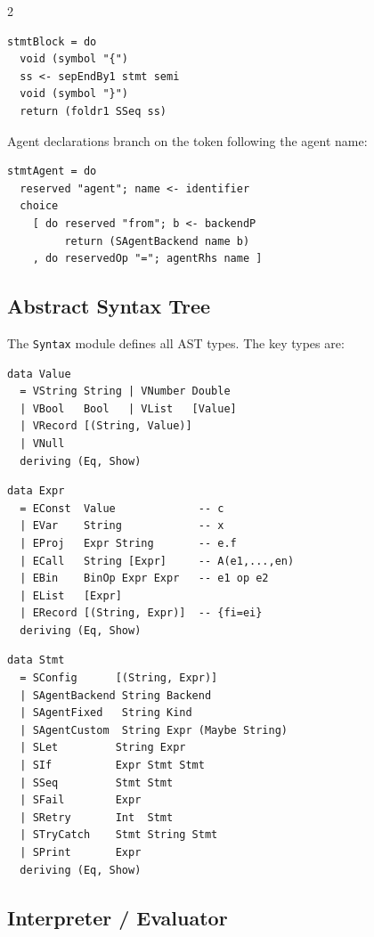 \documentclass[10pt]{article}
\begin{document}
\begin{multicols}{2}
\begin{lstlisting}[style=hs]
stmtBlock = do
  void (symbol "{")
  ss <- sepEndBy1 stmt semi
  void (symbol "}")
  return (foldr1 SSeq ss)
\end{lstlisting}

Agent declarations branch on the token following the agent name:

\begin{lstlisting}[style=hs]
stmtAgent = do
  reserved "agent"; name <- identifier
  choice
    [ do reserved "from"; b <- backendP
         return (SAgentBackend name b)
    , do reservedOp "="; agentRhs name ]
\end{lstlisting}

\subsection{Abstract Syntax Tree}

The \texttt{Syntax} module defines all AST types.  The key types are:

\begin{lstlisting}[style=hs, caption={Value -- Syntax.hs}]
data Value
  = VString String | VNumber Double
  | VBool   Bool   | VList   [Value]
  | VRecord [(String, Value)]
  | VNull
  deriving (Eq, Show)
\end{lstlisting}

\begin{lstlisting}[style=hs, caption={Expr -- Syntax.hs}]
data Expr
  = EConst  Value             -- c
  | EVar    String            -- x
  | EProj   Expr String       -- e.f
  | ECall   String [Expr]     -- A(e1,...,en)
  | EBin    BinOp Expr Expr   -- e1 op e2
  | EList   [Expr]
  | ERecord [(String, Expr)]  -- {fi=ei}
  deriving (Eq, Show)
\end{lstlisting}

\begin{lstlisting}[style=hs, caption={Stmt -- Syntax.hs}]
data Stmt
  = SConfig      [(String, Expr)]
  | SAgentBackend String Backend
  | SAgentFixed   String Kind
  | SAgentCustom  String Expr (Maybe String)
  | SLet         String Expr
  | SIf          Expr Stmt Stmt
  | SSeq         Stmt Stmt
  | SFail        Expr
  | SRetry       Int  Stmt
  | STryCatch    Stmt String Stmt
  | SPrint       Expr
  deriving (Eq, Show)
\end{lstlisting}

\subsection{Interpreter / Evaluator}


\end{multicols}
\end{document}

